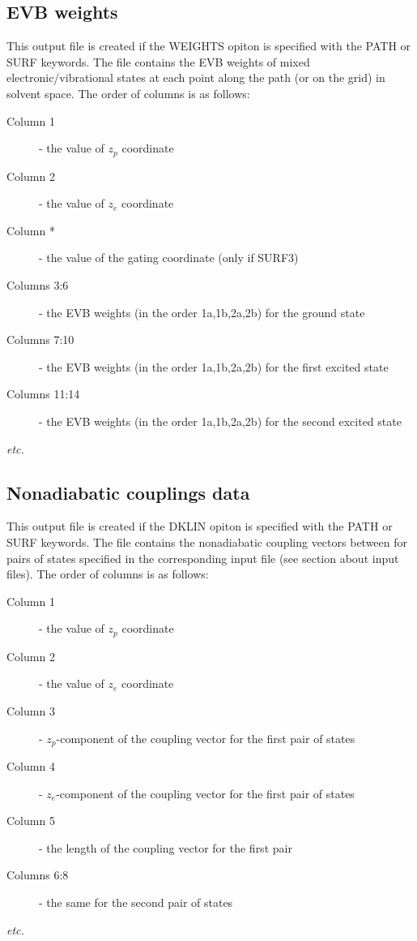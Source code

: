 \documentclass[oneside,11pt,openany]{book}
\newcommand{\tw}{\ttfamily}
\begin{document}
\subsection{EVB weights}
This output file is created if the {\tw WEIGHTS} opiton is specified
with the {\tw PATH} or {\tw SURF} keywords. The file contains
the EVB weights of mixed electronic/vibrational states at
each point along the path (or on the grid) in solvent space.
The order of columns is as follows:
\begin{description}
\item[Column 1] - the value of $z_p$ coordinate
\item[Column 2] - the value of $z_e$ coordinate
\item[Column *] - the value of the gating coordinate (only if {\tw SURF3})
\item[Columns 3:6] - the EVB weights (in the order 1a,1b,2a,2b)
                     for the ground state
\item[Columns 7:10] - the EVB weights (in the order 1a,1b,2a,2b)
                     for the first excited state

\item[Columns 11:14] - the EVB weights (in the order 1a,1b,2a,2b)
                     for the second excited state
\item[{\it etc.}]
\end{description}


\subsection{Nonadiabatic couplings data}
This output file is created if the {\tw DKLIN} opiton is specified
with the {\tw PATH} or {\tw SURF} keywords. The file contains
the nonadiabatic coupling vectors between for pairs of states
specified in the corresponding input file (see section about
input files). The order of columns is as follows:
\begin{description}
\item[Column 1] - the value of $z_p$ coordinate
\item[Column 2] - the value of $z_e$ coordinate
\item[Column 3] - $z_p$-component of the coupling vector
                  for the first pair of states
\item[Column 4] - $z_e$-component of the coupling vector
                  for the first pair of states
\item[Column 5] - the length of the coupling vector for the first pair
\item[Columns 6:8] - the same for the second pair of states
\item[{\it etc.}]
\end{description}
\end{document}
